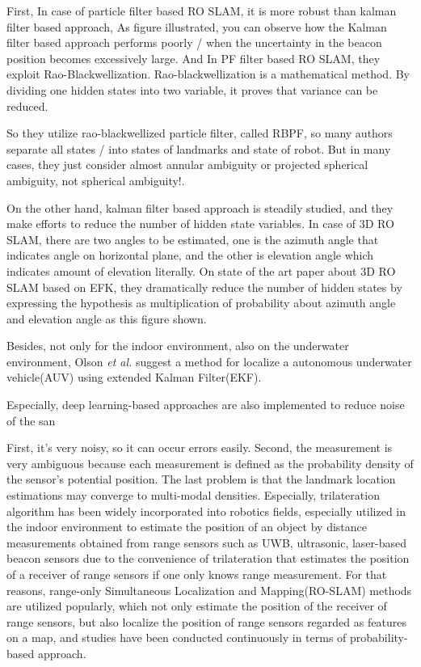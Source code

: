 \documentclass{ieeeaccess}
\begin{document}
First, In case of particle filter based RO SLAM, it is more robust than kalman filter based approach, As figure illustrated, you can observe how the Kalman filter based approach performs poorly / when the uncertainty in the beacon position becomes excessively large. And In PF filter based RO SLAM, they exploit Rao-Blackwellization. Rao-blackwellization is a mathematical method. By dividing one hidden states into two variable, it proves that variance can be reduced. 

So they utilize rao-blackwellized particle filter, called RBPF, so many authors separate all states / into states of landmarks and state of robot. But in many cases, they just consider almost annular ambiguity or projected spherical ambiguity, not spherical ambiguity!. 


On the other hand, kalman filter based approach is steadily studied, and they make efforts to reduce the number of hidden state variables. In case of 3D RO SLAM, there are two angles to be estimated, one is the azimuth angle that indicates angle on horizontal plane, and the other is elevation angle which indicates amount of elevation literally. On state of the art paper about 3D RO SLAM based on EFK, they dramatically reduce the number of hidden states by expressing the hypothesis as multiplication of probability about azimuth angle and elevation angle as this figure shown. 


Besides, not only for the indoor environment, also on the underwater environment, Olson \textit{et al.} suggest a method for localize a autonomous underwater vehicle(AUV) using extended Kalman Filter(EKF)\cite{olson2006robust}.

Especially, deep learning-based approaches are also implemented to reduce noise of the san

First, it’s very noisy, so it can occur errors easily. Second, the measurement is very ambiguous because each measurement is defined as the probability density of the sensor’s potential position. The last problem is that the landmark location estimations may converge to multi-modal densities.
Especially, trilateration algorithm has been widely incorporated into robotics fields, especially utilized in the indoor environment to estimate the position of an object by distance measurements obtained from range sensors such as UWB, ultrasonic, laser-based beacon sensors \cite{thomas2005revisiting, cho2010mobile,raghavan2010accurate} due to the convenience of trilateration that estimates the position of a receiver of range sensors if one only knows range measurement. For that reasons, range-only Simultaneous Localization and Mapping(RO-SLAM) methods are utilized popularly, which not only estimate the position of the receiver of range sensors, but also localize the position of range sensors regarded as features on a map, and studies have been conducted continuously in terms of probability-based approach\cite{blanco2008pure,blanco2008efficient,fabresse2013undelayed, shetty2018particle}.
\end{document}
